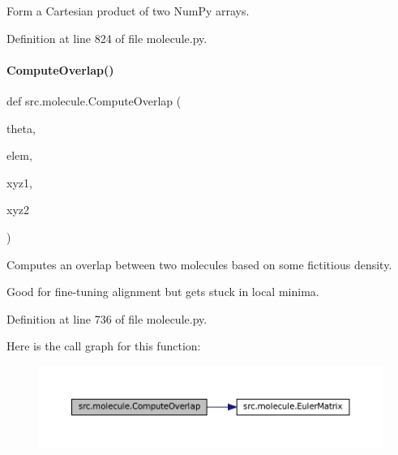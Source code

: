 Form a Cartesian product of two Num\+Py arrays. 



Definition at line 824 of file molecule.\+py.

\mbox{\label{namespacesrc_1_1molecule_a32c3d0fa2efc4d240274218803e1f42b}} 
\paragraph{\texorpdfstring{Compute\+Overlap()}{ComputeOverlap()}}
{\footnotesize\ttfamily def src.\+molecule.\+Compute\+Overlap (\begin{DoxyParamCaption}\item[{}]{theta,  }\item[{}]{elem,  }\item[{}]{xyz1,  }\item[{}]{xyz2 }\end{DoxyParamCaption})}



Computes an \textquotesingle{}overlap\textquotesingle{} between two molecules based on some fictitious density. 

Good for fine-\/tuning alignment but gets stuck in local minima. 

Definition at line 736 of file molecule.\+py.

Here is the call graph for this function\+:
\nopagebreak
\begin{figure}[H]
\begin{center}
\leavevmode
\includegraphics[width=350pt]{namespacesrc_1_1molecule_a32c3d0fa2efc4d240274218803e1f42b_cgraph}
\end{center}
\end{figure}
\mbox{\label{namespacesrc_1_1molecule_a940e04377db02e5114741a4bf8a6f084}} 
